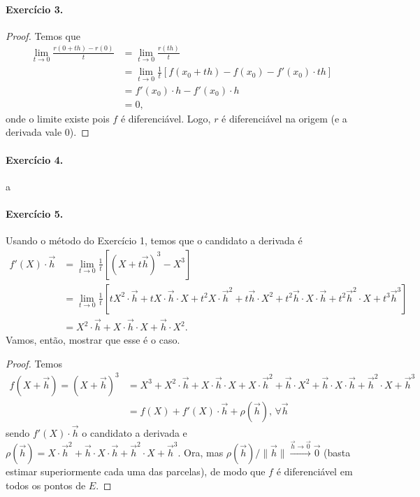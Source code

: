\documentclass[12pt,a4paper]{article}
\begin{document}
\paragraph{Exercício 3.}
    \begin{proof}
        Temos que
        \begin{align*}
            \lim_{t\to 0} \frac{r(0+th) - r(0)}{t} &= \lim_{t\to 0} \frac{r(th)}{t} \\
                                                   &= \lim_{t\to 0} \frac{1}{t}[f(x_0 + th) - f(x_0) 
                                                   - f'(x_0)\cdot th] \\
                                                   &= f'(x_0)\cdot h - f'(x_0)\cdot h \\
                                                   &= 0,
        \end{align*}
        onde o limite existe pois $f$ é diferenciável. Logo, $r$ é diferenciável na origem (e a derivada 
        vale $0$).
    \end{proof}
\paragraph{Exercício 4.}
    a
%
\paragraph{Exercício 5.}
    Usando o método do Exercício 1, temos que o candidato a derivada é
    \begin{align*}
        f'(X)\cdot\vec{h} &= \lim_{t\to 0}\frac{1}{t}\left[ (X+t\vec{h})^3 - X^3 \right] \\
                          &= \lim_{t\to 0}\frac{1}{t}\left[ tX^2\cdot\vec{h} + tX\cdot\vec{h}\cdot X
                          + t^2X\cdot\vec{h}^2 + t\vec{h}\cdot X^2 + t^2\vec{h}\cdot X\cdot\vec{h}
                          + t^2\vec{h}^2\cdot X + t^3\vec{h}^3 \right] \\
                          &= X^2\cdot\vec{h} + X\cdot\vec{h}\cdot X + \vec{h}\cdot X^2.
    \end{align*}    
    Vamos, então, mostrar que esse é o caso.
    \begin{proof}
        Temos
        \begin{align*}
            f(X+\vec{h}) = (X+\vec{h})^3 &= X^3 + X^2\cdot\vec{h} + X\cdot\vec{h}\cdot X
                                         + X\cdot\vec{h}^2 + \vec{h}\cdot X^2 + \vec{h}\cdot X\cdot\vec{h}
                                         + \vec{h}^2\cdot X + \vec{h}^3 \\
                                         &= f(X) + f'(X)\cdot\vec{h} + \rho(\vec{h}), \, \forall\vec{h}
        \end{align*}
        sendo $f'(X)\cdot\vec{h}$ o candidato a derivada e $\rho(\vec{h}) = X\cdot\vec{h}^2 + 
        \vec{h}\cdot X\cdot\vec{h} + \vec{h}^2\cdot X + \vec{h}^3$. Ora, mas 
        $\rho(\vec{h})/\|\vec{h}\| \xrightarrow{\vec{h}\to\vec{0}} \vec{0}$ (basta estimar superiormente
        cada uma das parcelas), de modo que $f$ é diferenciável em todos os pontos de $E$.
    \end{proof}
%
\end{document}
